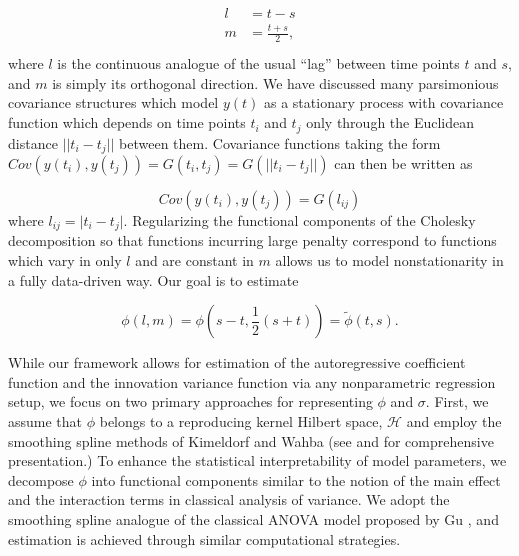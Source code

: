 \documentclass[12pt]{article}
\theoremstyle{definition}
\begin{document}
\begin{align} 
\begin{split}\label{eq:l-m-transformation}
l &= t - s \\
m &= \frac{t + s}{2}, \\
\end{split}
\end{align}
\noindent
 where $l$ is the continuous analogue of the usual ``lag'' between time points $t$ and $s$, and $m$ is simply its orthogonal direction. We have discussed many parsimonious covariance structures which model $y\left(t\right)$ as a stationary process with covariance function which depends on time points $t_i$ and $t_j$ only through the Euclidean distance $\vert \vert t_i - t_j \vert \vert$ between them. Covariance functions taking the form $Cov\left(y\left( t_i \right),y\left( t_j \right)\right) =G\left(t_i,t_j\right) = G\left(\vert \vert t_i - t_j \vert \vert \right)$ can then be written as 

\begin{equation*}
Cov\left(y\left( t_i \right),y\left( t_j \right)\right) = G\left( l_{ij}  \right)
\end{equation*}
\noindent
where $l_{ij} =  \vert  t_i - t_j  \vert $. Regularizing the functional components of the Cholesky decomposition so that functions incurring large penalty correspond to functions which vary in only $l$ and are constant in $m$ allows us to model nonstationarity in a fully data-driven way.  Our goal is to estimate

\begin{equation} 
\phi\left(l,m\right) = \phi\left(s-t, \frac{1}{2}\left(s+t\right)\right) = \tilde{\phi}\left(t,s\right).
\end{equation}

\bigskip

While our framework allows for estimation of the autoregressive coefficient function and the innovation variance function via any nonparametric regression setup, we focus on two primary approaches for representing $\phi$ and $\sigma$. First, we assume that $\phi$ belongs to a reproducing kernel Hilbert space, $\mathcal{H}$ and employ the smoothing spline methods of Kimeldorf and Wahba (see \citet{kimeldorf1971some} and \citet{wahba1990spline} for comprehensive presentation.)  To enhance the statistical interpretability of model parameters, we decompose $\phi$ into functional components similar to the notion of the main effect and the interaction terms in classical analysis of variance. We adopt the smoothing spline analogue of the classical ANOVA model proposed by Gu \citet{gu2013smoothing}, and estimation is achieved through similar computational strategies.
\end{document}
